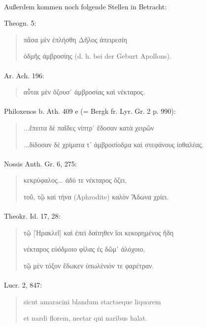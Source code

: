 \documentclass[a4paper, 11pt, oneside]{article}
\begin{document}
\paragraph{}
Außerdem kommen noch folgende Stellen in Betracht:

Theogn. 5:
\begin{quotation}
πᾶσα μὲν ἐπλήσθη Δῆλος ἀπειρεσίη

ὀδμῆς ἀμβροσίης (d. h. bei der Geburt Apollons).
\end{quotation}
\paragraph{}
Ar. Ach. 196:
\begin{quotation}
αὗται μὲν ὄζουσ᾽ ἀμβροσίας καὶ νέκταρος.
\end{quotation}
\paragraph{}
Philoxenos b. Ath. 409 e (= Bergk fr. Lyr. Gr. 2 p. 990):
\begin{quotation}
...ἔπειτα δὲ παῖδες νίπτρ᾽ ἔδοσαν κατὰ χειρῶν

...δίδοσαν δὲ χρίματα τ᾿ ἀμβροσίοδμα καὶ στεφάνους ἰοθαλέας.
\end{quotation}
\paragraph{}
Nossis Anth. Gr. 6, 275:
\begin{quotation}
κεκρύφαλος... ἀδύ τε νέκταρος ὄζει,

τοῦ, τῷ καὶ τήνα (Aphrodite) καλὸν Ἄδωνα χρίει.
\end{quotation}
\paragraph{}
Theokr. Id. 17, 28:
\begin{quotation}
τῷ [Ἡρακλεῖ] καὶ ἐπεὶ δαίτηθεν ἴοι κεκορημένος ἤδη

νέκταρος εὐόδμοιο φίλας ἐς δῶμ᾽ ἀλόχοιο,

τῷ μὲν τόξον ἔδωκεν ὑπωλένιόν τε φαρέτραν.
\end{quotation}
\paragraph{}
Lucr. 2, 847:
\begin{quotation}
sicut amaracini blandum stactaeque liquorem

et nardi florem, nectar qui naribus halat.
\end{quotation}
\end{document}
